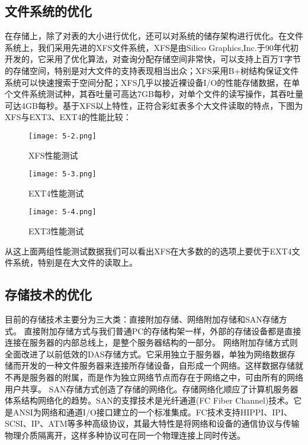\subsection{文件系统的优化}
在存储上，除了对表的大小进行优化，还可以对系统的储存架构进行优化。在文件系统上，我们采用先进的XFS文件系统，XFS是由Silico Graphics,Inc.于90年代初开发的，它采用了优化算法，对查询分配存储空间非常快，可以支持上百万T字节的存储空间，特别是对大文件的支持表现相当出众；XFS采用B+树结构保证文件系统可以快速搜索于空间分配；XFS几乎以接近裸设备I/O的性能存储数据，在单个文件系统测试种，其吞吐量可高达7GB每秒，对单个文件的读写操作，其吞吐量可达4GB每秒。基于XFS以上特性，正符合彩虹表多个大文件读取的特点，下图为XFS与EXT3、EXT4的性能比较：
\begin{figure}[!ht]
\centering
\texttt{[image: 5-2.png]}
\caption{XFS性能测试}
\label{fig:5.2}
\end{figure}
\begin{figure}[!ht]
\centering
\texttt{[image: 5-3.png]}
\caption{EXT4性能测试}
\end{figure}
\begin{figure}[!ht]
\centering
\texttt{[image: 5-4.png]}
\caption{EXT3性能测试}
\end{figure}
从这上面两组性能测试数据我们可以看出XFS在大多数的的选项上要优于EXT4文件系统，特别是在大文件的读取上。
\subsection{存储技术的优化}
目前的存储技术主要分为三大类：直接附加存储、网络附加存储和SAN存储方式。
直接附加存储方式与我们普通PC的存储构架一样，外部的存储设备都是直接连接在服务器的内部总线上，是整个服务器结构的一部分。
网络附加存储方式则全面改进了以前低效的DAS存储方式。它采用独立于服务器，单独为网络数据存储而开发的一种文件服务器来连接所存储设备，自形成一个网络。这样数据存储就不再是服务器的附属，而是作为独立网络节点而存在于网络之中，可由所有的网络用户共享。
SAN存储方式创造了存储的网络化。存储网络化顺应了计算机服务器体系结构网络化的趋势。SAN的支撑技术是光纤通道(FC Fiber Channel)技术。它是ANSI为网络和通道I/O接口建立的一个标准集成。FC技术支持HIPPI、IPI、SCSI、IP、ATM等多种高级协议，其最大特性是将网络和设备的通信协议与传输物理介质隔离开，这样多种协议可在同一个物理连接上同时传送。

